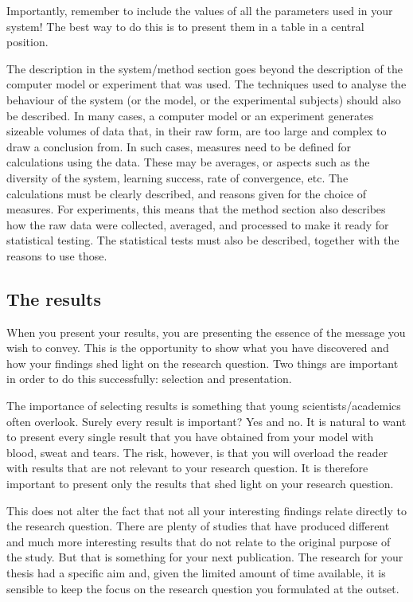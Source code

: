 Importantly, remember to include the values of all the parameters used in your system! The best way to do this is to present them in a table in a central position.

The description in the system/method section goes beyond the description of the computer model or experiment that was used.
The techniques used to analyse the behaviour of the system (or the model, or the experimental subjects) should also be described.
In many cases, a computer model or an experiment generates sizeable volumes of data that, in their raw form, are too large and complex to draw a conclusion from.
In such cases, measures need to be defined for calculations using the data.
These may be averages, or aspects such as the diversity of the system, learning success, rate of convergence, etc.
The calculations must be clearly described, and reasons given for the choice of measures.
For experiments, this means that the method section also describes how the raw data were collected, averaged, and processed to make it ready for statistical testing.
The statistical tests must also be described, together with the reasons to use those.

\subsection{The results}\label{sec:_the_results}
When you present your results, you are presenting the essence of the message you wish to convey.
This is the opportunity to show what you have discovered and how your findings shed light on the research question.
Two things are important in order to do this successfully: selection and presentation.

The importance of selecting results is something that young scientists/academics often overlook.
Surely every result is important? Yes and no.
It is natural to want to present every single result that  you have obtained from your model with blood, sweat and tears.
The risk, however, is that you will overload the reader with results that are not relevant to your research question.
It is therefore important to present only the results that shed light on your research question.

This does not alter the fact that not all your interesting findings relate directly to the research question.
There are plenty of studies that have produced different and much more interesting results that do not relate to the original purpose of the study.
But that is something for your next publication.
The research for your thesis had a specific aim and, given the limited amount of time available, it is sensible to keep the focus on the research question you formulated at the outset.

